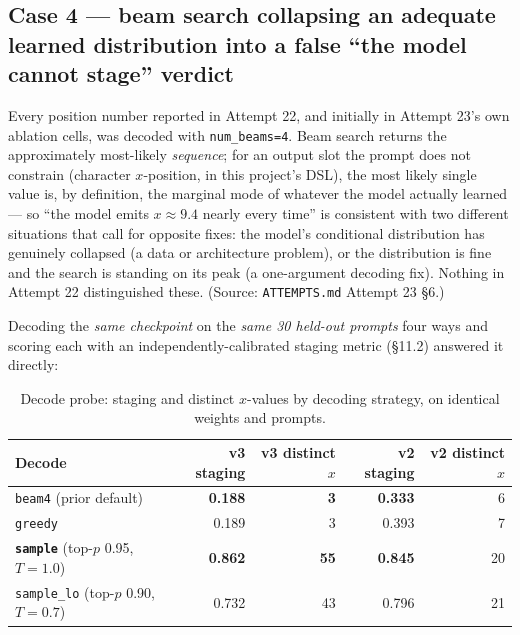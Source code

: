\documentclass[11pt]{article}
\newcommand{\secsym}{\S}
\begin{document}
\subsection{Case 4 --- beam search collapsing an adequate learned distribution into a false ``the model cannot stage'' verdict}
\label{sec:case4}

Every position number reported in Attempt 22, and initially in Attempt
23's own ablation cells, was decoded with \texttt{num\_beams=4}. Beam
search returns the approximately most-likely \emph{sequence}; for an
output slot the prompt does not constrain (character $x$-position, in this
project's DSL), the most likely single value is, by definition, the
marginal mode of whatever the model actually learned --- so ``the model
emits $x\approx9.4$ nearly every time'' is consistent with two different
situations that call for opposite fixes: the model's conditional
distribution has genuinely collapsed (a data or architecture problem), or
the distribution is fine and the search is standing on its peak (a
one-argument decoding fix). Nothing in Attempt 22 distinguished these.
(Source: \texttt{ATTEMPTS.md} Attempt 23 \secsym6.)

Decoding the \emph{same checkpoint} on the \emph{same 30 held-out
prompts} four ways and scoring each with an independently-calibrated
staging metric (\secsym11.2) answered it directly:

\begin{table}[h]
\centering
\caption{Decode probe: staging and distinct $x$-values by decoding
strategy, on identical weights and prompts.}
\label{tab:decodeprobe}
\begin{tabular}{@{}lrrrr@{}}
\toprule
Decode & v3 staging & v3 distinct $x$ & v2 staging & v2 distinct $x$ \\
\midrule
\texttt{beam4} (prior default) & \textbf{0.188} & \textbf{3} & \textbf{0.333} & 6 \\
\texttt{greedy} & 0.189 & 3 & 0.393 & 7 \\
\textbf{\texttt{sample}} (top-$p$ 0.95, $T{=}1.0$) & \textbf{0.862} & \textbf{55} & \textbf{0.845} & 20 \\
\texttt{sample\_lo} (top-$p$ 0.90, $T{=}0.7$) & 0.732 & 43 & 0.796 & 21 \\
\bottomrule
\end{tabular}
\end{table}
\end{document}
